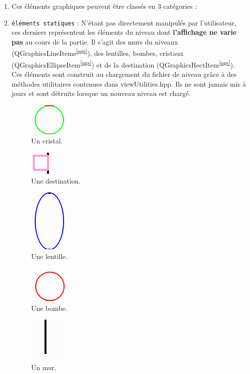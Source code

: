 \documentclass[a4paper,11pt]{report}
\begin{document}
\begin{enumerate}
	\item[] Ces éléments graphiques peuvent être classés en 3 catégories :
	\item \texttt{éléments statiques} : 
		N'étant pas directement manipulés par l'utilisateur, ces derniers représentent
		les éléments du niveau dont \textbf{l'affichage ne varie pas} au cours de la partie. Il
		s'agit des murs du niveaux (QGraphicsLineItems\textsuperscript{\ref{qgs}}), des lentilles, bombes,
		cristaux (QGraphicsEllipseItem\textsuperscript{\ref{qgs}}) et de la destination
		(QGraphicsRectItem\textsuperscript{\ref{qgs}}).
		Ces éléments sont construit au chargement du fichier de niveau grâce à
		des méthodes utilitaires contenues dans viewUtilities.hpp. 
		Ils ne sont jamais mis à jours et sont détruits lorsque un nouveau niveau est
		chargé. 

		\begin{figure}[h!]
			\caption{Un cristal.}
			\includegraphics{./screenshots/elements_statiques/crystal}
		\end{figure}
		\begin{figure}[h!]
			\caption{Une destination.}
			\includegraphics{./screenshots/elements_statiques/dest}
		\end{figure}
		\begin{figure}[h!]
			\caption{Une lentille.}
			\includegraphics{./screenshots/elements_statiques/lens}
		\end{figure}
		\begin{figure}[h!]
			\caption{Une bombe.}
			\includegraphics{./screenshots/elements_statiques/nuke}
		\end{figure}
		\begin{figure}[h!]
			\caption{Un mur.}
			\includegraphics{./screenshots/elements_statiques/wall}
		\end{figure}


\end{enumerate}
\end{document}
